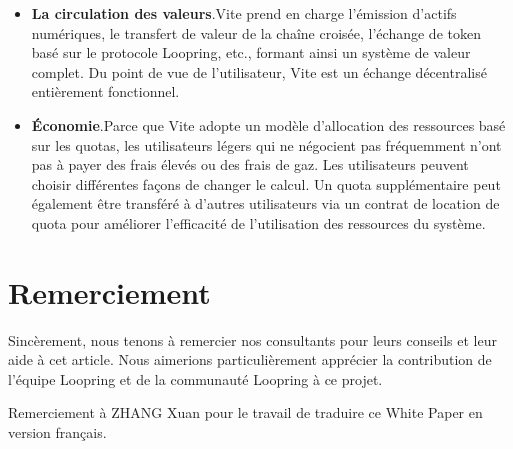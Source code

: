 \documentclass[UTF8,nofonts]{article}
\begin{document}
\begin{multicols}{2}
\begin{itemize}
	\item \textbf{La circulation des valeurs}.Vite prend en charge l'émission d'actifs numériques, le transfert de valeur de la chaîne croisée, l'échange de token basé sur le protocole Loopring, etc., formant ainsi un système de valeur complet. Du point de vue de l'utilisateur, Vite est un échange décentralisé entièrement fonctionnel.
	\item \textbf{Économie}.Parce que Vite adopte un modèle d'allocation des ressources basé sur les quotas, les utilisateurs légers qui ne négocient pas fréquemment n'ont pas à payer des frais élevés ou des frais de gaz. Les utilisateurs peuvent choisir différentes façons de changer le calcul. Un quota supplémentaire peut également être transféré à d'autres utilisateurs via un contrat de location de quota pour améliorer l'efficacité de l'utilisation des ressources du système.
\end{itemize}
\section{Remerciement}
Sincèrement, nous tenons à remercier nos consultants pour leurs conseils et leur aide à cet article. Nous aimerions particulièrement apprécier la contribution de l'équipe Loopring et de la communauté Loopring à ce projet. 

Remerciement à ZHANG Xuan pour le travail de traduire ce White Paper en version français.

\end{multicols}



\end{document}
